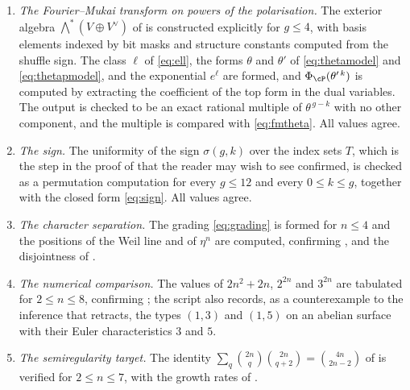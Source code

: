 \begin{enumerate}[label=\textup{(\Roman*)},leftmargin=*]
\item \emph{The Fourier--Mukai transform on powers of the polarisation.}
  The exterior algebra $\bigwedge^{*}(V\oplus V^{\vee})$ of
   is constructed explicitly for $g\le4$, with basis elements
  indexed by bit masks and structure constants computed from the shuffle sign.
  The class $\ell$ of \eqref{eq:ell}, the forms $\theta$ and $\theta'$ of
  \eqref{eq:thetamodel} and \eqref{eq:thetapmodel}, and the exponential
  $e^{\ell}$ are formed, and $\Phi_{\cP}(\theta'^{\,k})$ is computed by
  extracting the coefficient of the top form in the dual variables. The output
  is checked to be an exact rational multiple of $\theta^{\,g-k}$ with no
  other component, and the multiple is compared with \eqref{eq:fmtheta}. All
  values agree.

\item \emph{The sign.} The uniformity of the sign $\sigma(g,k)$ over the
  index sets $T$, which is the step in the proof of  that
  the reader may wish to see confirmed, is checked as a permutation
  computation for every $g\le12$ and every $0\le k\le g$, together with the
  closed form \eqref{eq:sign}. All values agree.

\item \emph{The character separation.} The grading \eqref{eq:grading} is
  formed for $n\le4$ and the positions of the Weil line and of $\eta^{n}$ are
  computed, confirming ,  and the
  disjointness of .

\item \emph{The numerical comparison.} The values of $2n^{2}+2n$, $2^{2n}$
  and $3^{2n}$ are tabulated for $2\le n\le8$, confirming
  ; the script also records, as a counterexample to the
  inference that  retracts, the types $(1,3)$ and $(1,5)$ on
  an abelian surface with their Euler characteristics $3$ and $5$.

\item \emph{The semiregularity target.} The identity
  $\sum_{q}\binom{2n}{q}\binom{2n}{q+2}=\binom{4n}{2n-2}$ of
   is verified for $2\le n\le7$, with the growth rates of
  .


\end{enumerate}
